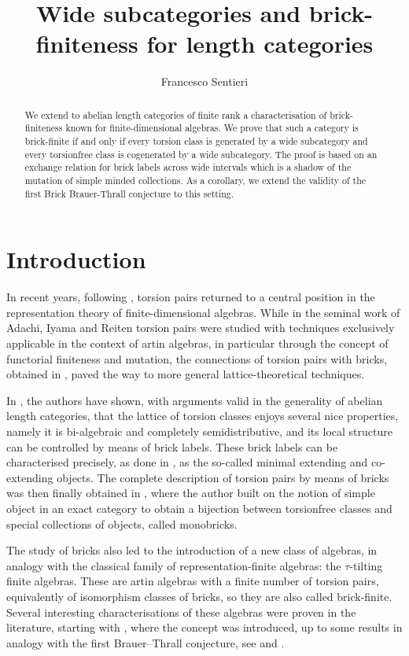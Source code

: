 \documentclass[11pt]{amsart}
\title[Wide subcategories and brick-finiteness]{Wide subcategories and brick-finiteness for length categories}
\author{Francesco Sentieri}
\theoremstyle{definition}
\begin{document}
\begin{abstract}
We extend to abelian length categories of finite rank a characterisation of brick-finiteness known for finite-dimensional algebras. We prove that such a category is brick-finite if and only if every torsion class is generated by a wide subcategory and every torsionfree class is cogenerated by a wide subcategory. The proof is based on an exchange relation for brick labels across wide intervals which is a shadow of the mutation of simple minded collections. As a corollary, we extend the validity of the first Brick Brauer-Thrall conjecture to this setting.
\end{abstract}

\maketitle

\tableofcontents

\section{Introduction}

In recent years, following \cite{AIR}, torsion pairs returned to a central position in the representation theory of finite-dimensional algebras. While in the seminal work of Adachi, Iyama and Reiten torsion pairs were studied with techniques exclusively applicable in the context of artin algebras, in particular through the concept of functorial finiteness and mutation, the connections of torsion pairs with bricks, obtained in \cite{DIJ}, paved the way to more general lattice-theoretical techniques.

In \cite{DIRRT}, the authors have shown, with arguments valid in the generality of abelian length categories, that the lattice of torsion classes enjoys several nice properties, namely it is bi-algebraic and completely semidistributive, and its local structure can be controlled by means of brick labels. These brick labels can be characterised precisely, as done in \cite{BCZ}, as the so-called minimal extending and co-extending objects. The complete description of torsion pairs by means of bricks was then finally obtained in \cite{EnomotoMonobrick}, where the author built on the notion of simple object in an exact category to obtain a bijection between torsionfree classes and special collections of objects, called monobricks.

The study of bricks also led to the introduction of a new class of algebras, in analogy with the classical family of representation-finite algebras: the \(\tau\)-tilting finite algebras. These are artin algebras with a finite number of torsion pairs, equivalently of isomorphism classes of bricks, so they are also called brick-finite. Several interesting characterisations of these algebras were proven in the literature, starting with \cite{DIJ}, where the concept was introduced, up to some results in analogy with the first Brauer--Thrall conjecture, see \cite{SchrollTreffinger} and \cite{MousavandPaquetteBT}.
\end{document}
